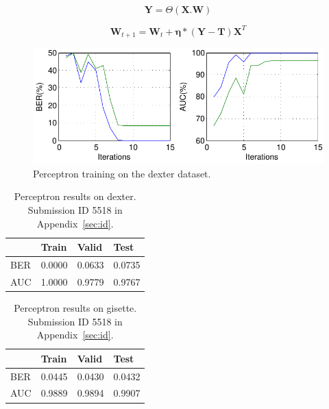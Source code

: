 \documentclass{ecsarticle}     %
\begin{document}
\begin{equation}
   \textbf{Y} = \Theta ( \textbf{X}.\textbf{W})
   \label{eqn:slp_mat}
\end{equation}

\begin{equation}	
	\textbf{W}_{t+1} = \textbf{W}_t + \mathbf{\eta}*(\mathbf{Y}-\mathbf{T})\mathbf{X}^T
	\label{eqn:slp_learn}
\end{equation}


\begin{figure}[ht]
   \centering
    \includegraphics[width = 14cm]{SLP_train.pdf}
   \caption{Perceptron training on the dexter dataset.}
   \label{fig:slp_train}
\end{figure}


\begin{table}[h]
	\centering
	\begin{tabular}{|l|l|l|l|} \hline
     			& Train & Valid & Test \\ \hline
		BER & 0.0000 & 0.0633 & 0.0735 \\ \hline
		AUC & 1.0000 & 0.9779 & 0.9767 \\ \hline
	\end{tabular}
	\caption{Perceptron results on dexter. Submission ID 5518 in Appendix~\ref{sec:id}.}
	\label{tab:slp_dexter}
\end{table}

\begin{table}[h]
	\centering
	\begin{tabular}{|l|l|l|l|} \hline
     			& Train & Valid & Test \\ \hline
		BER & 0.0445 & 0.0430 & 0.0432 \\ \hline
		AUC & 0.9889 & 0.9894 & 0.9907 \\ \hline
	\end{tabular}
	\caption{Perceptron results on gisette. Submission ID 5518 in Appendix~\ref{sec:id}.}
	\label{tab:slp_gisette}
\end{table}
\end{document}
